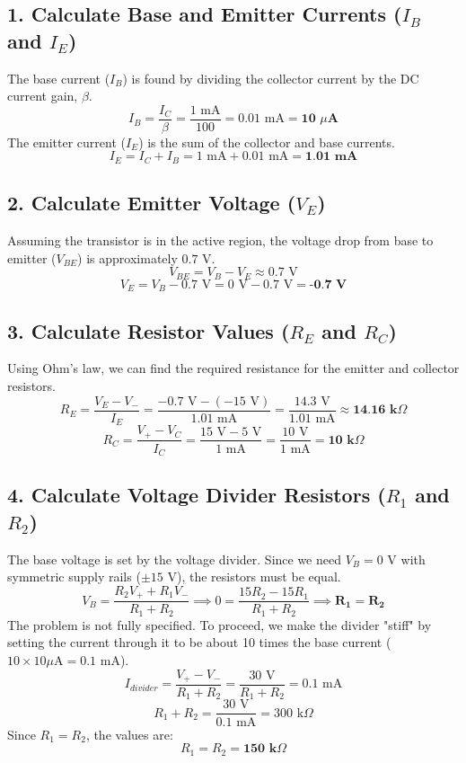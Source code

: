 \documentclass{article}
\begin{document}
\subsection*{1. Calculate Base and Emitter Currents ($I_B$ and $I_E$)}
The base current ($I_B$) is found by dividing the collector current by the DC current gain, $\beta$.
\[ I_{B} = \frac{I_{C}}{\beta} = \frac{1 \text{ mA}}{100} = 0.01 \text{ mA} = \textbf{10 } \mu\textbf{A} \]
The emitter current ($I_E$) is the sum of the collector and base currents.
\[ I_{E} = I_{C} + I_{B} = 1 \text{ mA} + 0.01 \text{ mA} = \textbf{1.01 mA} \]

\subsection*{2. Calculate Emitter Voltage ($V_E$)}
Assuming the transistor is in the active region, the voltage drop from base to emitter ($V_{BE}$) is approximately $0.7 \text{ V}$.
\[ V_{BE} = V_B - V_E \approx 0.7 \text{ V} \]
\[ V_E = V_B - 0.7 \text{ V} = 0 \text{ V} - 0.7 \text{ V} = \textbf{-0.7 V} \]

\subsection*{3. Calculate Resistor Values ($R_E$ and $R_C$)}
Using Ohm's law, we can find the required resistance for the emitter and collector resistors.
\[ R_{E} = \frac{V_{E} - V_{-}}{I_{E}} = \frac{-0.7 \text{ V} - (-15 \text{ V})}{1.01 \text{ mA}} = \frac{14.3 \text{ V}}{1.01 \text{ mA}} \approx \textbf{14.16 k}\Omega \]
\[ R_{C} = \frac{V_{+} - V_{C}}{I_{C}} = \frac{15 \text{ V} - 5 \text{ V}}{1 \text{ mA}} = \frac{10 \text{ V}}{1 \text{ mA}} = \textbf{10 k}\Omega \]

\subsection*{4. Calculate Voltage Divider Resistors ($R_1$ and $R_2$)}
The base voltage is set by the voltage divider. Since we need $V_B = 0 \text{ V}$ with symmetric supply rails ($\pm 15 \text{ V}$), the resistors must be equal.
\[ V_{B} = \frac{R_2 V_+ + R_1 V_-}{R_1 + R_2} \implies 0 = \frac{15R_2 - 15R_1}{R_1+R_2} \implies \textbf{R}_{\textbf{1}} = \textbf{R}_{\textbf{2}} \]
The problem is not fully specified. To proceed, we make the divider "stiff" by setting the current through it to be about 10 times the base current ($10 \times 10 \mu\text{A} = 0.1 \text{ mA}$).
\[ I_{divider} = \frac{V_+ - V_-}{R_1 + R_2} = \frac{30 \text{ V}}{R_1 + R_2} = 0.1 \text{ mA} \]
\[ R_1 + R_2 = \frac{30 \text{ V}}{0.1 \text{ mA}} = 300 \text{ k}\Omega \]
Since $R_1 = R_2$, the values are:
\[ R_1 = R_2 = \textbf{150 k}\Omega \]
\end{document}
